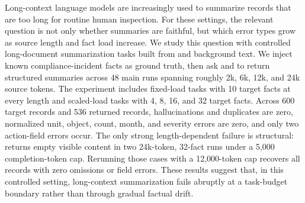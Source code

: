 Long-context language models are increasingly used to summarize records that are too long for routine human inspection. For these settings, the relevant question is not only whether summaries are faithful, but which error types grow as source length and fact load increase. We study this question with controlled long-document summarization tasks built from \qmsum and \govreport background text. We inject known compliance-incident facts as ground truth, then ask \gptfourmini and \gptfivemini to return structured summaries across 48 main runs spanning roughly 2k, 6k, 12k, and 24k source tokens. The experiment includes fixed-load tasks with 10 target facts at every length and scaled-load tasks with 4, 8, 16, and 32 target facts. Across 600 target records and 536 returned records, hallucinations and duplicates are zero, normalized unit, object, count, month, and severity errors are zero, and only two action-field errors occur. The only strong length-dependent failure is structural: \gptfivemini returns empty visible content in two 24k-token, 32-fact runs under a 5,000 completion-token cap. Rerunning those cases with a 12,000-token cap recovers all records with zero omissions or field errors. These results suggest that, in this controlled setting, long-context summarization fails abruptly at a task-budget boundary rather than through gradual factual drift.
